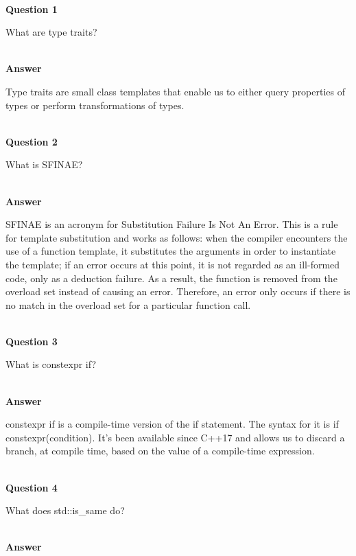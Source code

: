 \hspace*{\fill} \\ %
\noindent
\textbf{Question 1}

What are type traits?

\hspace*{\fill} \\ %
\noindent
\textbf{Answer}

Type traits are small class templates that enable us to either query properties of types or perform transformations of types.


\hspace*{\fill} \\ %
\noindent
\textbf{Question 2}

What is SFINAE?

\hspace*{\fill} \\ %
\noindent
\textbf{Answer}

SFINAE is an acronym for Substitution Failure Is Not An Error. This is a rule for template substitution and works as follows: when the compiler encounters the use of a function template, it substitutes the arguments in order to instantiate the template; if an error occurs at this point, it is not regarded as an ill-formed code, only as a deduction failure. As a result, the function is removed from the overload set instead of causing an error. Therefore, an error only occurs if there is no match in the overload set for a particular function call.

\hspace*{\fill} \\ %
\noindent
\textbf{Question 3}

What is constexpr if?

\hspace*{\fill} \\ %
\noindent
\textbf{Answer}

constexpr if is a compile-time version of the if statement. The syntax for it is if constexpr(condition). It’s been available since C++17 and allows us to discard a branch, at compile time, based on the value of a compile-time expression.

\hspace*{\fill} \\ %
\noindent
\textbf{Question 4}

What does std::is\_same do?

\hspace*{\fill} \\ %
\noindent
\textbf{Answer}

